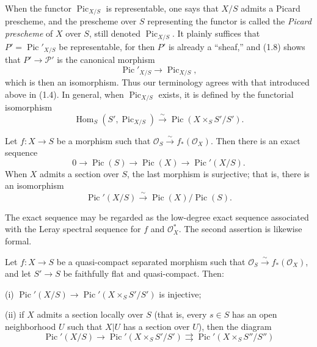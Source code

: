 When the functor $\operatorname{Pic}_{X/S}$ is representable, one says that
$X/S$ admits a Picard prescheme, and the prescheme over $S$ representing the
functor is called the \emph{Picard prescheme} of $X$ over $S$, still denoted
$\operatorname{Pic}_{X/S}$. It plainly suffices that
$P'=\operatorname{Pic}'_{X/S}$ be representable, for then $P'$ is already a
“sheaf,” and (1.8) shows that $P'\longrightarrow\mathcal P'$ is the canonical
morphism
\begin{equation}
\operatorname{Pic}'_{X/S}\longrightarrow\operatorname{Pic}_{X/S},
\tag{1.9}
\end{equation}
which is then an isomorphism. Thus our terminology agrees with that introduced
above in (1.4). In general, when $\operatorname{Pic}_{X/S}$ exists, it is
defined by the functorial isomorphism
\begin{equation}
\operatorname{Hom}_S(S',\operatorname{Pic}_{X/S})\xrightarrow{\sim}
\operatorname{Pic}(X\times_SS'/S').
\tag{1.10}
\end{equation}


 Let $f:X\longrightarrow S$ be a morphism such that
$\mathcal O_S\xrightarrow{\sim}f_*(\mathcal O_X)$. Then there is an exact
sequence
\[
0\longrightarrow\operatorname{Pic}(S)\longrightarrow\operatorname{Pic}(X)
\longrightarrow\operatorname{Pic}'(X/S).
\]
When $X$ admits a section over $S$, the last morphism is surjective; that is,
there is an isomorphism
\[
\operatorname{Pic}'(X/S)\xrightarrow{\sim}
\operatorname{Pic}(X)/\operatorname{Pic}(S).
\]

The exact sequence may be regarded as the low-degree exact sequence associated
with the Leray spectral sequence for $f$ and $\mathcal O_X^*$. The second
assertion is likewise formal.

 Let $f:X\longrightarrow S$ be a quasi-compact
separated morphism such that
$\mathcal O_S\xrightarrow{\sim}f_*(\mathcal O_X)$, and let
$S'\longrightarrow S$ be faithfully flat and quasi-compact. Then:

\noindent (i) $\operatorname{Pic}'(X/S)\longrightarrow
\operatorname{Pic}'(X\times_SS'/S')$ is injective;

\noindent (ii) if $X$ admits a section locally over $S$ (that is, every
$s\in S$ has an open neighborhood $U$ such that $X|U$ has a section over $U$),
then the diagram
\[
\operatorname{Pic}'(X/S)\longrightarrow
\operatorname{Pic}'(X\times_SS'/S')\rightrightarrows
\operatorname{Pic}'(X\times_SS''/S'')
\]

